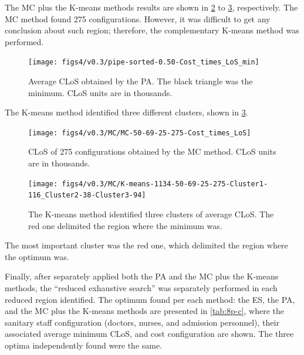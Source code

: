 The MC plus the K-means methods results are shown in \ref{subfig:mc8-3}
to \ref{subfig:km8-3}, respectively. The MC method found 275 configurations.
However, it was difficult to get any conclusion about such region;
therefore, the complementary K-means method was performed.
\begin{figure}[H]
\centering{}\texttt{[image: figs4/v0.3/pipe-sorted-0.50-Cost\_times\_LoS\_min]}\caption{Average CLoS obtained by the PA. The black triangle was the minimum.
CLoS units are in thousands. \label{subfig:pipe8-3} }
\end{figure}
The K-means method identified three different clusters, shown in \ref{subfig:km8-3}.
\begin{figure}[H]
\centering{}\texttt{[image: figs4/v0.3/MC/MC-50-69-25-275-Cost\_times\_LoS]}\caption{CLoS of 275 configurations obtained by the MC method. CLoS units are
in thousands. \label{subfig:mc8-3}}
\end{figure}
\begin{figure}[H]
\begin{centering}
\texttt{[image: figs4/v0.3/MC/K-means-1134-50-69-25-275-Cluster1-116\_Cluster2-38-Cluster3-94]}
\par\end{centering}

\caption{The K-means method identified three clusters of average CLoS. The
red one delimited the region where the minimum was. \label{subfig:km8-3}}
\end{figure}
 The most important cluster was the red one, which delimited the region
where the optimum was. 

Finally, after separately applied both the PA and the MC plus the
K-means methods, the \textquotedblleft{}reduced exhaustive search\textquotedblright{}
was separately performed in each reduced region identified. The optimum
found per each method: the ES, the PA, and the MC plus the K-means
methods are presented in \ref{tab:8p-c}, where the sanitary staff
configuration (doctors, nurses, and admission personnel), their associated
average minimum CLoS, and cost configuration are shown. The three
optima independently found were the same.

